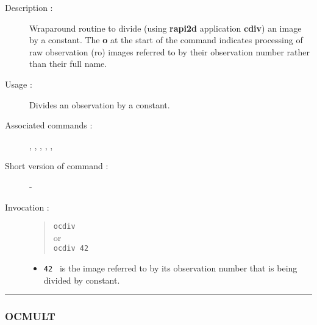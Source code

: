 \begin{description}

\item[Description :] Wraparound routine to divide (using {\bf rapi2d}
application {\bf cdiv}) an image by a constant. The {\bf o} at the start of the
command indicates processing of raw observation ({\sc ro}) images
referred to by their observation number rather than their full name.

\item[Usage :] Divides an observation by a constant.

\item[Associated commands :] {\tt {}},
{\tt {}}, {\tt {}},
{\tt {}}, {\tt {}}, {\tt {}}

\item[Short version of command :] -
\item[Invocation :]

\begin{quote}{\tt  ocdiv }\\
or \\
{\tt ocdiv 42 }
\end{quote}

\begin{itemize}

\item {\tt 42 } is the image referred to by its observation number that
is being divided by constant.
\end{itemize}

\end{description}

\hrule
\subsubsection*{\label{OCMULT}OCMULT}

